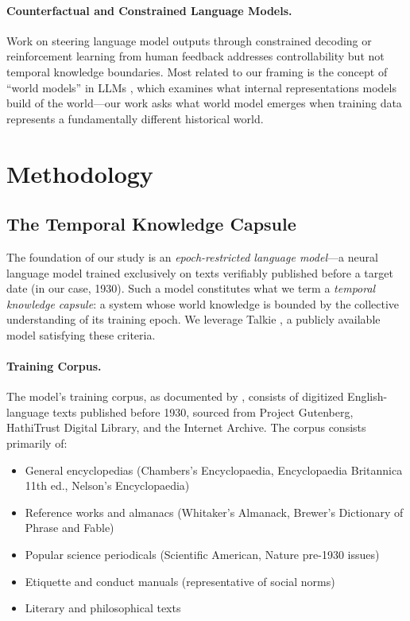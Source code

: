 \documentclass[11pt]{article}
\begin{document}
\paragraph{Counterfactual and Constrained Language Models.} Work on steering language model outputs through constrained decoding \cite{lu2022neurologic} or reinforcement learning from human feedback \cite{ouyang2022training} addresses controllability but not temporal knowledge boundaries. Most related to our framing is the concept of ``world models'' in LLMs \cite{li2023emergent}, which examines what internal representations models build of the world---our work asks what world model emerges when training data represents a fundamentally different historical world.

\section{Methodology}

\subsection{The Temporal Knowledge Capsule}

The foundation of our study is an \textit{epoch-restricted language model}---a neural language model trained exclusively on texts verifiably published before a target date (in our case, 1930). Such a model constitutes what we term a \textit{temporal knowledge capsule}: a system whose world knowledge is bounded by the collective understanding of its training epoch. We leverage Talkie \cite{radford2026talkie}, a publicly available model satisfying these criteria.

\paragraph{Training Corpus.} The model's training corpus, as documented by \citet{radford2026talkie}, consists of digitized English-language texts published before 1930, sourced from Project Gutenberg, HathiTrust Digital Library, and the Internet Archive. The corpus consists primarily of:
\begin{itemize}[nosep,leftmargin=*]
\item General encyclopedias (Chambers's Encyclopaedia, Encyclopaedia Britannica 11th ed., Nelson's Encyclopaedia)
\item Reference works and almanacs (Whitaker's Almanack, Brewer's Dictionary of Phrase and Fable)
\item Popular science periodicals (Scientific American, Nature pre-1930 issues)
\item Etiquette and conduct manuals (representative of social norms)
\item Literary and philosophical texts
\end{itemize}
\end{document}
